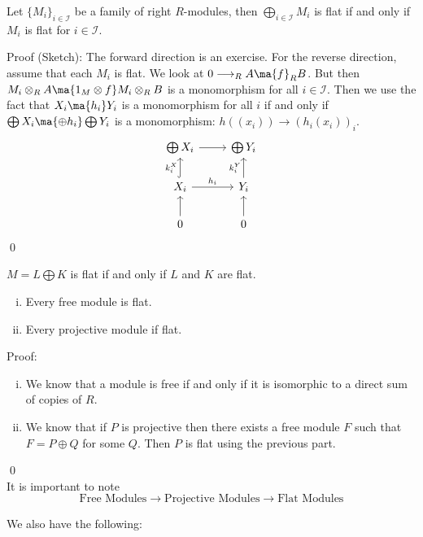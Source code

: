 \begin{prop}
Let $\{M_i\}_{i \in \mathcal{I}}$ be a family of right $R$-modules, then $\bigoplus_{i \in \mathcal{I}} M_i$ is flat if and only if $M_i$ is flat for $i \in \mathcal{I}$. 
\end{prop}

Proof (Sketch): The forward direction is an exercise. For the reverse direction, assume that each $M_i$ is flat. We look at $0 \longrightarrow _R A \ma{f} _R B$. But then $M_i \otimes_R A \ma{1_M \otimes f} M_i \otimes_R B$ is a monomorphism for all $i \in \mathcal{I}$. Then we use the fact that $X_i \ma{h_i} Y_i$ is a monomorphism for all $i$ if and only if $\bigoplus X_i \ma{\oplus h_i} \bigoplus Y_i$ is a monomorphism: $h((x_i)) \rightarrow (h_i(x_i))_i$. 
\[
\begin{tikzcd}
\bigoplus X_i \arrow{r} & \bigoplus Y_i \\
X_i \arrow[hook]{u}{k_i^X} \arrow{r}{h_i} & Y_i \arrow{u}{k_i^Y} \\
0 \arrow{u} & 0 \arrow{u}
\end{tikzcd}
\]
\qed \\

\begin{cor}
$M=L \bigoplus K$ is flat if and only if $L$ and $K$ are flat. 
\end{cor}

\begin{cor}
\begin{enumerate}[(i)]
\item Every free module is flat.
\item Every projective module if flat. 
\end{enumerate}
\end{cor}

Proof:
\begin{enumerate}[(i)]
\item We know that a module is free if and only if it is isomorphic to a direct sum of copies of $R$. 
\item We know that if $P$ is projective then there exists a free module $F$ such that $F=P \oplus Q$ for some $Q$. Then $P$ is flat using the previous part. 
\end{enumerate}
\qed \\

It is important to note
\[
\text{Free Modules} \longrightarrow \text{Projective Modules} \longrightarrow \text{Flat Modules} 
\]

We also have the following:

